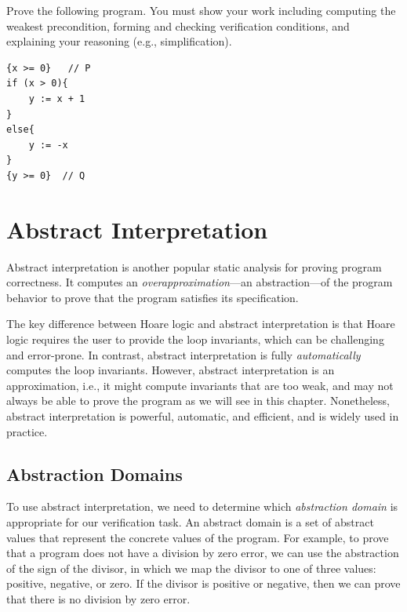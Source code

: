 \documentclass[oneside,11pt,dvipsnames]{book}
\begin{document}
Prove the following program. You must show your work including computing the weakest precondition, forming and checking verification conditions, and explaining your reasoning (e.g., simplification).

\begin{lstlisting}
{x >= 0}   // P 
if (x > 0){
    y := x + 1
}
else{
    y := -x
}
{y >= 0}  // Q
\end{lstlisting}


\chapter{Abstract Interpretation}

Abstract interpretation is another popular static analysis for proving program correctness.  It computes an \emph{overapproximation}---an abstraction---of the program behavior to prove that the program satisfies its specification.


The key difference between Hoare logic and abstract interpretation is that Hoare logic requires the user to provide the loop invariants, which can be challenging and error-prone.  In contrast, abstract interpretation is fully \emph{automatically} computes the loop invariants.  However,  abstract interpretation is an approximation, i.e., it might compute invariants that are too weak, and may not always be able to prove the program as we will see in this chapter.  Nonetheless, abstract interpretation is powerful, automatic, and efficient, and is widely used in practice.


\section{Abstraction Domains}\label{sec:abstract-domains}

To use abstract interpretation, we need to determine which \emph{abstraction domain} is appropriate for our verification task. An abstract domain is a set of abstract values that represent the concrete values of the program.  For example, to prove that a program does not have a division by zero error, we can use the abstraction of the sign of the divisor, in which we map the divisor to one of three values: positive, negative, or zero.  If the divisor is positive or negative, then we can prove that there is no division by zero error. %
\end{document}
